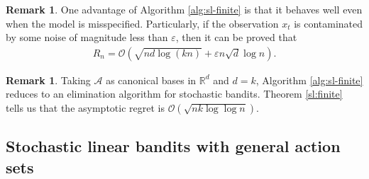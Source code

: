\documentclass[10pt,a4article]{amsart}
\numberwithin{equation}{section}
\theoremstyle{plain}
\theoremstyle{definition}
\newtheorem{Rem}[Th]{Remark}
\def\R{{\mathbb R}}
\def\R{{\mathbb R}}
\def\e{{\varepsilon}}
\begin{document}
\begin{Rem}
One advantage of Algorithm \ref{alg:sl-finite} is that it behaves well even when the model is misspecified. Particularly, if the observation $x_t$ is contaminated by some noise of magnitude less than $\e$, then it can be proved that 
\begin{align*}
R_n=\mathcal O\left(\sqrt{nd\log (kn)}+\e n\sqrt{d}\log n\right). 
\end{align*}
\end{Rem}

\begin{Rem}
Taking $\mathcal A$ as canonical bases in $\R^d$ and $d=k$,  Algorithm \ref{alg:sl-finite} reduces to an elimination algorithm for stochastic bandits. Theorem \ref{sl:finite} tells us that the asymptotic regret is $\mathcal O(\sqrt{nk\log\log n})$.   
\end{Rem}

\subsection{Stochastic linear bandits with general action sets}
\end{document}
